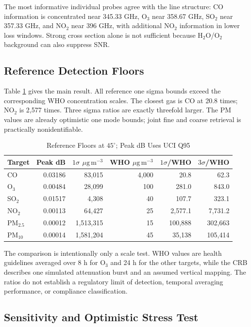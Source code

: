 \documentclass[conference]{IEEEtran}
\newcommand{\ugm}{\ensuremath{\mu\mathrm{g\,m}^{-3}}}
\newcommand{\pmfive}{PM$_{2.5}$}
\newcommand{\pmten}{PM$_{10}$}
\begin{document}
The most informative individual probes agree with the line structure: CO information is concentrated near 345.33 GHz, O$_3$ near 358.67 GHz, SO$_2$ near 357.33 GHz, and NO$_2$ near 396 GHz, with additional NO$_2$ information in lower loss windows. Strong cross section alone is not sufficient because H$_2$O/O$_2$ background can also suppress SNR.

\subsection{Reference Detection Floors}

Table \ref{tab:floors} gives the main result. All reference one sigma bounds exceed the corresponding WHO concentration scales. The closest gas is CO at 20.8 times; NO$_2$ is 2,577 times. Three sigma ratios are exactly threefold larger. The PM values are already optimistic one mode bounds; joint fine and coarse retrieval is practically nonidentifiable.

\begin{table}[t]
\caption{Reference Floors at $45^\circ$; Peak dB Uses UCI Q95}
\label{tab:floors}
\centering
\scriptsize
\setlength{\tabcolsep}{2.5pt}
\begin{tabular}{@{}lrrrrr@{}}
\toprule
Target & Peak dB & $1\sigma$ \ugm & WHO \ugm & $1\sigma$/WHO & $3\sigma$/WHO \\
\midrule
CO & 0.03186 & 83,015 & 4,000 & 20.8 & 62.3 \\
O$_3$ & 0.00484 & 28,099 & 100 & 281.0 & 843.0 \\
SO$_2$ & 0.01517 & 4,308 & 40 & 107.7 & 323.1 \\
NO$_2$ & 0.00113 & 64,427 & 25 & 2,577.1 & 7,731.2 \\
\pmfive & 0.00012 & 1,513,315 & 15 & 100,888 & 302,663 \\
\pmten & 0.00014 & 1,581,204 & 45 & 35,138 & 105,414 \\
\bottomrule
\end{tabular}
\end{table}

The comparison is intentionally only a scale test. WHO values are health guidelines averaged over 8 h for O$_3$ and 24 h for the other targets, while the CRB describes one simulated attenuation burst and an assumed vertical mapping. The ratios do not establish a regulatory limit of detection, temporal averaging performance, or compliance classification.

\subsection{Sensitivity and Optimistic Stress Test}
\end{document}

